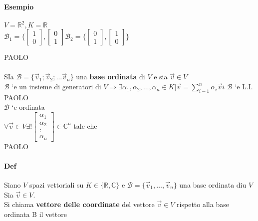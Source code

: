 \paragraph{Esempio} $V= \mathbb{R}^2, K=\mathbb{R}$\\
$
\mathcal{B}_1= \{ 
    \begin{bmatrix}
        1\\0
    \end{bmatrix}
    ,
    \begin{bmatrix}
        0\\1
    \end{bmatrix}
\mathcal{B}_2= \{ 
    \begin{bmatrix}
        0\\1
    \end{bmatrix}
    ,
    \begin{bmatrix}
        1\\0
    \end{bmatrix}
\}$

PAOLO\\\\
SIa $\mathcal{B}=\{\vec{v}_1;\vec{v}_2;\dots\vec{v}_n\}$ una \textbf{base ordinata} di $V$ e sia $\vec{v}\in V$\\
$\mathcal{B}$ `e un insieme di generatori di $V\Longrightarrow \exists\alpha_1,\alpha_2,\dots,\alpha_n\in K\Big|\vec{v}
=\sum_{i-1}^{n}\alpha_i\vec{v}i$
$\mathcal{B}$ `e L.I. \\
PAOLO\\
$\mathcal{B}$ `e ordinata \\
\large{
    $\forall \vec{v}\in V \exists!
    \begin{bmatrix}
        \alpha_1\\
        \alpha_2\\
        :\\
        \alpha_n
    \end{bmatrix}
    \in\mathbb{C}^n $
}
tale che \\
PAOLO\\

\paragraph{Def}
Siano $V$ spazi vettoriali su $K \in\{\mathbb{R}, \mathbb{C}\}$ e $\mathcal{B}=\{\vec{v}_1, \dots, \vec{v}_n\}$ una base ordinata diu $V$\\
Sia $\vec{v}\in V$.\\
Si chiama \textbf{vettore delle coordinate} del vettore $\vec{v}\in V$ rispetto alla base ordinata B il vettore 

